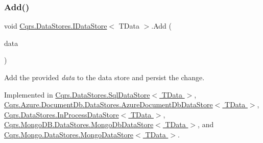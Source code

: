 \mbox{\label{interfaceCqrs_1_1DataStores_1_1IDataStore_a906f3f2f80db7a549a4170eca4653e26_a906f3f2f80db7a549a4170eca4653e26}} 
\subsubsection{\texorpdfstring{Add()}{Add()}\hspace{0.1cm}{\footnotesize\ttfamily [2/2]}}
{\footnotesize\ttfamily void \hyperlink{interfaceCqrs_1_1DataStores_1_1IDataStore}{Cqrs.\+Data\+Stores.\+I\+Data\+Store}$<$ T\+Data $>$.Add (\begin{DoxyParamCaption}\item[{I\+Enumerable$<$ T\+Data $>$}]{data }\end{DoxyParamCaption})}



Add the provided {\itshape data}  to the data store and persist the change. 



Implemented in \hyperlink{classCqrs_1_1DataStores_1_1SqlDataStore_a45aa105f2571510223c6073804690487_a45aa105f2571510223c6073804690487}{Cqrs.\+Data\+Stores.\+Sql\+Data\+Store$<$ T\+Data $>$}, \hyperlink{classCqrs_1_1Azure_1_1DocumentDb_1_1DataStores_1_1AzureDocumentDbDataStore_a2d91050f17273687e44a121623803e7a_a2d91050f17273687e44a121623803e7a}{Cqrs.\+Azure.\+Document\+Db.\+Data\+Stores.\+Azure\+Document\+Db\+Data\+Store$<$ T\+Data $>$}, \hyperlink{classCqrs_1_1DataStores_1_1InProcessDataStore_ad62504e478f0a907c18ec4aa9b42703a_ad62504e478f0a907c18ec4aa9b42703a}{Cqrs.\+Data\+Stores.\+In\+Process\+Data\+Store$<$ T\+Data $>$}, \hyperlink{classCqrs_1_1MongoDB_1_1DataStores_1_1MongoDbDataStore_a709fc1e29d266a7c19a46bd181d03963_a709fc1e29d266a7c19a46bd181d03963}{Cqrs.\+Mongo\+D\+B.\+Data\+Stores.\+Mongo\+Db\+Data\+Store$<$ T\+Data $>$}, and \hyperlink{classCqrs_1_1Mongo_1_1DataStores_1_1MongoDataStore_a38c242b255dc17cf8d19470fdf5a99bf_a38c242b255dc17cf8d19470fdf5a99bf}{Cqrs.\+Mongo.\+Data\+Stores.\+Mongo\+Data\+Store$<$ T\+Data $>$}.

\mbox{\label{interfaceCqrs_1_1DataStores_1_1IDataStore_aa7ade96f2f3151d5353cf7bdbb2baec5_aa7ade96f2f3151d5353cf7bdbb2baec5}} 
